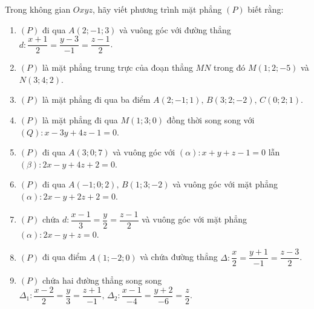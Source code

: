 \begin{vd}
	Trong không gian $Oxyz$, hãy viết phương trình mặt phẳng $(P)$ biết rằng:
	\begin{enumerate}
		\item $(P)$ đi qua $A(2;-1;3)$ và vuông góc với đường thẳng $d\colon \dfrac{x+1}{2}=\dfrac{y-3}{-1}=\dfrac{z-1}{2}$.
		\item $(P)$ là mặt phẳng trung trực của đoạn thẳng $MN$ trong đó $M(1;2;-5)$ và $N(3;4;2)$.
		\item $(P)$ là mặt phẳng đi qua ba điểm $A(2;-1;1),\,B(3;2;-2),\,C(0;2;1)$.
		\item $(P)$ là mặt phẳng đi qua $M(1;3;0)$ đồng thời song song với $(Q)\colon x-3y+4z-1=0$.
		\item $(P)$ đi qua $A(3;0;7)$ và vuông góc với $(\alpha)\colon x+y+z-1=0$ lẫn $(\beta)\colon 2x-y+4z+2=0$.
		\item $(P)$ đi qua $A(-1;0;2),\,B(1;3;-2)$ và vuông góc với mặt phẳng $(\alpha)\colon 2x-y+2z+2=0$.
		\item $(P)$ chứa $d\colon\dfrac{x-1}{3}=\dfrac{y}{2}=\dfrac{z-1}{2}$ và vuông góc với mặt phẳng $(\alpha)\colon 2x-y+z=0$.
		\item $(P)$ đi qua điểm $A(1;-2;0)$ và chứa đường thẳng $\Delta\colon \dfrac{x}{2}=\dfrac{y+1}{-1}=\dfrac{z-3}{2}$.
		\item $(P)$ chứa hai đường thẳng song song $\Delta_1\colon \dfrac{x-2}{2}=\dfrac{y}{3}=\dfrac{z+1}{-1},\,\Delta_2\colon \dfrac{x-1}{-4}=\dfrac{y+2}{-6}=\dfrac{z}{2}$.
	\end{enumerate}
\end{vd}
